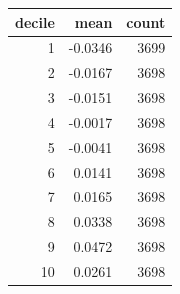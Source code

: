 \begin{tabular}{rrr}
\toprule
decile & mean & count \\
\midrule
1 & -0.0346 & 3699 \\
2 & -0.0167 & 3698 \\
3 & -0.0151 & 3698 \\
4 & -0.0017 & 3698 \\
5 & -0.0041 & 3698 \\
6 & 0.0141 & 3698 \\
7 & 0.0165 & 3698 \\
8 & 0.0338 & 3698 \\
9 & 0.0472 & 3698 \\
10 & 0.0261 & 3698 \\
\bottomrule
\end{tabular}
